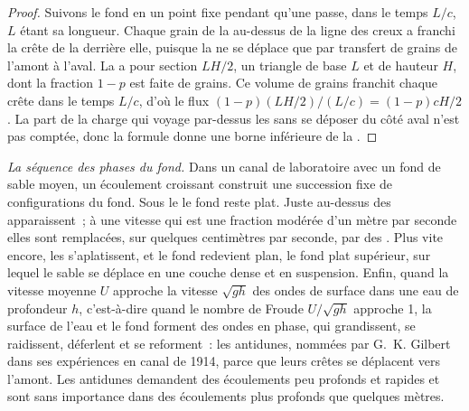 \begin{proof}
Suivons le fond en un point fixe pendant qu'une  passe, dans le temps $L/c$, $L$
étant sa longueur. Chaque grain de la  au-dessus de la ligne des creux
a franchi la crête de la  derrière elle, puisque la  ne se déplace que par
transfert de grains de l'amont à l'aval. La  a pour section $LH/2$, un
triangle de base $L$ et de hauteur $H$, dont la fraction $1 - p$ est faite de grains.
Ce volume de grains franchit chaque crête dans le temps $L/c$, d'où le flux
$(1-p)(LH/2)/(L/c) = (1-p)cH/2$. La part de la charge qui voyage par-dessus les
 sans se déposer du côté aval n'est pas comptée, donc la formule donne
une borne inférieure de la .
\end{proof}

\emph{La séquence des phases du fond.} Dans un canal de laboratoire avec un fond de sable
moyen, un écoulement croissant construit une succession fixe de configurations du fond.
Sous le  le fond reste plat. Juste au-dessus des  apparaissent~;
à une vitesse qui est une fraction modérée d'un mètre par seconde elles sont
remplacées, sur quelques centimètres par seconde, par des . Plus vite encore, les 
s'aplatissent, et le fond redevient plan, le fond plat supérieur, sur lequel le sable
se déplace en une couche dense et en suspension. Enfin, quand la vitesse moyenne $U$
approche la vitesse $\sqrt{gh}$ des ondes de surface dans une eau de profondeur $h$, c'est-à-dire
quand le nombre de Froude $U/\sqrt{gh}$ approche 1, la surface de l'eau et le fond
forment des ondes en phase, qui grandissent, se raidissent, déferlent et se reforment~: les antidunes, nommées
par G.~K. Gilbert dans ses expériences en canal de 1914, parce que leurs crêtes se déplacent
vers l'amont. Les antidunes demandent des écoulements peu profonds et rapides et sont sans importance dans des écoulements plus profonds
que quelques mètres.

